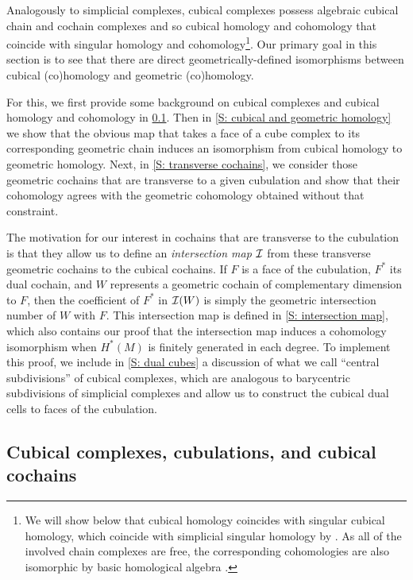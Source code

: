 Analogously to simplicial complexes, cubical complexes possess algebraic cubical chain and cochain complexes and so cubical homology and cohomology that coincide with singular homology and cohomology\footnote{We will show below that cubical homology coincides with singular cubical homology, which coincide with simplicial singular homology by \cite{EM53}.
As all of the involved chain complexes are free, the corresponding cohomologies are also isomorphic by basic homological algebra \cite[Theorem 45.5]{Mun84}.\label{FN: cubical and singular}}.
Our primary goal in this section is to see that there are direct geometrically-defined isomorphisms between cubical (co)homology and geometric (co)homology.

For this, we first provide some background on cubical complexes and cubical homology and cohomology in \cref{S: cubes}.
Then in \cref{S: cubical and geometric homology} we show that the obvious map that takes a face of a cube complex to its corresponding geometric chain induces an isomorphism from cubical homology to geometric homology.
Next, in \cref{S: transverse cochains}, we consider those geometric cochains that are transverse to a given cubulation and show that their cohomology agrees with the geometric cohomology obtained without that constraint.

The motivation for our interest in cochains that are transverse to the cubulation is that they allow us to define an \textit{intersection map} $\mathcal{I}$ from these transverse geometric cochains to the cubical cochains.
If $F$ is a face of the cubulation, $F^*$ its dual cochain, and $W$ represents a geometric cochain of complementary dimension to $F$, then the coefficient of $F^*$ in $\mathcal{I}(W)$ is simply the geometric intersection number of $W$ with $F$.
This intersection map is defined in \cref{S: intersection map}, which also contains our proof that the intersection map induces a cohomology isomorphism when $H^*(M)$ is finitely generated in each degree.
To implement this proof, we include in \cref{S: dual cubes} a discussion of what we call ``central subdivisions'' of cubical complexes, which are analogous to barycentric subdivisions of simplicial complexes and allow us to construct the cubical dual cells to faces of the cubulation.

\subsection{Cubical complexes, cubulations, and cubical cochains}\label{S: cubes}


